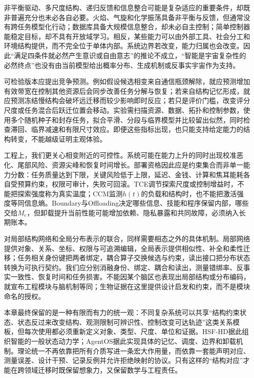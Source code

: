 非平衡驱动、多尺度结构、递归反馈和信息整合可能是复杂适应的重要条件，却既非普遍充分也未必各自必要。火焰、气旋和化学振荡具备非平衡与反馈，但通常没有跨任务模型化行动；数据库具备大规模信息整合，却未必自主控制；简单控制器能稳定目标，却不具有开放域学习。相反，某些能力可以由外部工具、社会分工和环境结构提供，而不完全位于单体内部。系统边界若改变，能力归属也会改变。因此“满足四条件就必然产生意识或自由意志”的推论不成立，“智能是宇宙复杂性的必然终点”也没有由当前模型给出概率分布、生成机制或反事实宇宙作为支持。

可检验版本应提出竞争预测。例如假设候选相变来自通信瓶颈解除，就应预测增加有效带宽在控制其他资源后会同步改善任务分解与恢复；若来自结构记忆形成，就应预测冻结慢结构会破坏远迁移而较少影响即时反应；若只是评价门槛，改变评分尺度或任务混合后跃迁位置会移动。实验需扫描资源、数据、拓扑和控制参数，使用多个随机种子和封存任务，拟合平滑、分段与临界模型并比较留出似然，同时检查滞回、临界减速和有限尺寸效应。即便这些指标出现，也只能支持给定能力的结构转变，不能越级证明主观体验。

工程上，我们更关心相变附近的可控性。系统可能在能力上升的同时出现校准恶化、尾部风险、资源尖峰和恢复时间增长。部署资格因此应是约束集合而非单一能力分数：任务质量达到下限，关键风险低于上限，延迟、金钱、计算和焦耳能耗各自受预算约束，权限可审计，失败可回滚。TCE调节探索尺度或控制增益时，不能把探索强度称为真实温度；CCM监测$h(t)$的负载和结构时，也不能把激活强度等同信息熵。Boundary与Offloading决定哪些信息、技能和程序保留内部，哪些交给$M_e$，但卸载提升当前性能可能增加依赖、隐私暴露和共同故障，必须纳入长期账本。

对局部结构网络和全局分布表示的联合，同样需要相态之外的具体机制。局部网络提供对象、关系、坐标、权限与可追溯编辑，全局表示提供相似性、补全和柔性迁移；任务相关身份键把两者绑定，耦合算子交换候选与约束，读出接口把分布状态转换为可执行契约。我们应分别消融身份、绑定、耦合和读出，测量错绑率、反事实一致性、恢复时间和任务损害。不能因某个脑区也表现出局部结构或分布编码，就宣布工程模块与脑机制等同；生物证据在这里提供设计启发和约束，而不是模块命名的授权。

本章最终保留的是一种有限而有力的统一观：不同复杂系统可以共享“结构约束状态、状态反过来改变结构、观测限制可辨识性、控制改变可达轨迹”这类关系模板，但每次使用都必须重新定义对象、类型、尺度、单位和证据。HSF-HD据此组织智能的一般状态动力学；AgentOS据此实现具体的记忆、调度、边界和卸载机制。理论统一不再依靠把所有介质写进一条宏大作用量，而依靠一套能声明对应、测量误差、设计干预、记录反例并允许拒绝映射的协议。只有这样的“结构对应”才能在跨领域迁移时既保留想象力，又保留数学与工程责任。
